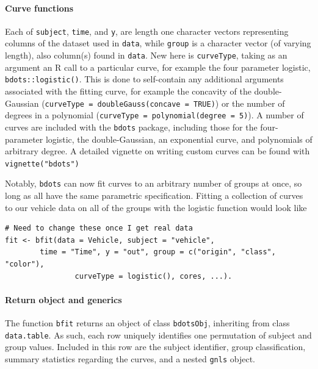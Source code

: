 \documentclass{article}
\newcommand{\xt}{\texttt}%
\begin{document}
\paragraph{Curve functions} Each of \texttt{subject}, \texttt{time}, and \texttt{y}, are length one character vectors representing columns of the dataset used in \texttt{data}, while \xt{group} is a character vector (of varying length), also column(s) found in \xt{data}. New here is \texttt{curveType}, taking as an argument an R call to a particular curve, for example the four parameter logistic, \texttt{bdots::logistic()}. This is done to self-contain any additional arguments associated with the fitting curve, for example the concavity of the double-Gaussian (\texttt{curveType = doubleGauss(concave = TRUE)}) or the number of degrees in a polynomial (\texttt{curveType = polynomial(degree = 5)}). A number of curves are included with the \texttt{bdots} package, including those for the four-parameter logistic, the double-Gaussian, an exponential curve, and polynomials of arbitrary degree. A detailed vignette on writing custom curves can be found with \texttt{vignette("bdots")}

Notably, \texttt{bdots} can now fit curves to an arbitrary number of groups at once, so long as all have the same parametric specification. Fitting a collection of curves to our vehicle data on all of the groups with the logistic function would look like


\begin{center}
\begin{verbatim}
# Need to change these once I get real data
fit <- bfit(data = Vehicle, subject = "vehicle", 
	 	time = "Time", y = "out", group = c("origin", "class", "color"),
	 			curveType = logistic(), cores, ...).
\end{verbatim}
\end{center}


\paragraph{Return object and generics}



The function \texttt{bfit} returns an object of class \texttt{bdotsObj}, inheriting from class \texttt{data.table}. As such, each row uniquely identifies one permutation of subject and group values. Included in this row are the subject identifier, group classification, summary statistics regarding the curves, and a nested \xt{gnls} object.
\end{document}
